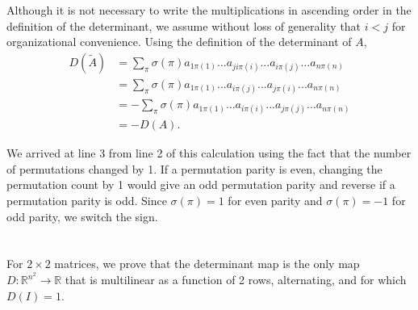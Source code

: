 \documentclass[11pt]{article}
\begin{document}
Although it is not necessary to write the multiplications in ascending order in the definition of the determinant, we assume without loss of generality that $i < j$ for organizational convenience. Using the definition of the determinant of $A$,
\begin{align}
D(\tilde{A}) &= \sum_{\pi} \sigma(\pi)a_{1\pi(1)}...a_{ji\pi(i)}...a_{i\pi(j)}...a_{n\pi(n)} \\
&= \sum_{\pi} \sigma(\pi)a_{1\pi(1)}...a_{i\pi(j)}...a_{j\pi(i)}...a_{n\pi(n)} \\ 
&= -\sum_{\pi} \sigma(\pi)a_{1\pi(1)}...a_{i\pi(i)}...a_{j\pi(j)}...a_{n\pi(n)} \\
&= -D(A).
\end{align}

We arrived at line 3 from line 2 of this calculation using the fact that the number of permutations changed by 1. If a permutation parity is even, changing the permutation count by 1 would give an odd permutation parity and reverse if a permutation parity is odd. Since $\sigma(\pi) = 1$ for even parity and $\sigma(\pi) = -1$ for odd parity, we switch the sign. 

\section{}

For $2\times 2$ matrices, we prove that the determinant map is the only map $D : \mathbb{R}^{n^2} \rightarrow \mathbb{R}$ that is multilinear as a function of 2 rows, alternating, and for which $D(I) = 1$.
\end{document}
